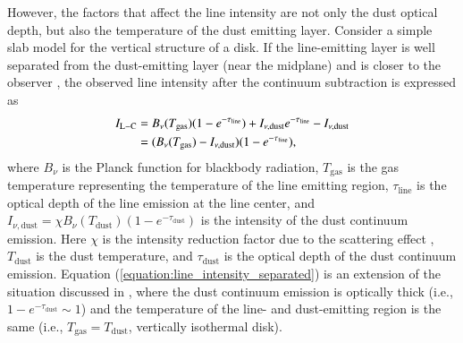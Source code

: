 \documentclass[twocolumn, twocolappendix, astrosymb, times]{aastex631}
\begin{document}
However, the factors that affect the line intensity are not only the dust optical depth, but also the temperature of the dust emitting layer. Consider a simple slab model for the vertical structure of a disk. If the line-emitting layer is well separated from the dust-emitting layer (near the midplane) and is closer to the observer \citep[see e.g.,][]{Bosman2021}, the observed line intensity after the continuum subtraction is expressed as 
\begin{align}\label{equation:line_intensity_separated}
    I_\mathrm{L-C} &= B_\nu(T_\mathrm{gas})(1 - e^{-\tau_\mathrm{line}}) + I_{\nu, \mathrm{dust}}e^{-\tau_\mathrm{line}} - I_{\nu, \mathrm{dust}} \notag \\
    &= (B_\nu(T_\mathrm{gas}) - I_{\nu, \mathrm{dust}})(1 - e^{-\tau_\mathrm{line}}),
\end{align}
where $B_\nu$ is the Planck function for blackbody radiation, $T_\mathrm{gas}$ is the gas temperature representing the temperature of the line emitting region, $\tau_\mathrm{line}$ is the optical depth of the line emission at the line center, and $I_{\nu, \mathrm{dust}} = \chi B_\nu(T_\mathrm{dust})(1 - e^{-\tau_\mathrm{dust}})$ is the intensity of the dust continuum emission. Here $\chi$ is the intensity reduction factor due to the scattering effect \citep[e.g.,][]{Bosman2021}, $T_\mathrm{dust}$ is the dust temperature, and $\tau_\mathrm{dust}$ is the optical depth of the dust continuum emission. Equation (\ref{equation:line_intensity_separated}) is an extension of the situation discussed in \citet{Bosman2021}, where the dust continuum emission is optically thick (i.e., $1 - e^{-\tau_\mathrm{dust}} \sim 1$) and the temperature of the line- and dust-emitting region is the same (i.e., $T_\mathrm{gas} = T_\mathrm{dust}$, vertically isothermal disk).
\end{document}

